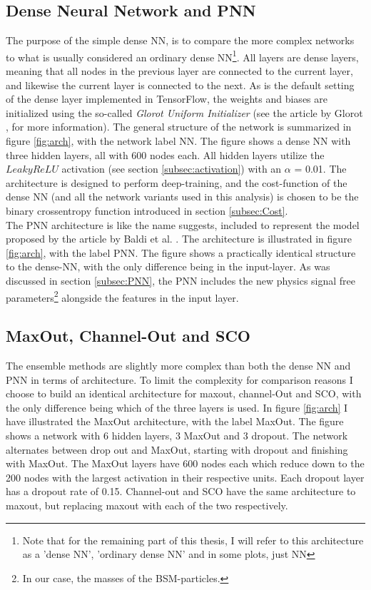 \subsection*{Dense Neural Network and PNN}\label{subsec:PNNArch}
The purpose of the simple dense \ac{NN}, is to compare the more complex networks to what is usually considered an ordinary dense \ac{NN}\footnote{Note 
that for the remaining part of this thesis, I will refer to this architecture as a 'dense \ac{NN}', 'ordinary dense \ac{NN}' and in some plots, just 
\ac{NN}}.
All layers are dense layers, meaning that all nodes in the previous layer are connected to the current layer, and likewise
the current layer is connected to the next. As is the default setting of the dense layer implemented in TensorFlow, the weights and biases are initialized 
using the so-called \emph{Glorot Uniform Initializer} (see the article by Glorot \cite{glorot_understanding_2010}, for more information). 
The general structure of the network is summarized in figure \ref{fig:arch}, with the network label \ac{NN}. The figure shows a dense \ac{NN} with 
three hidden layers, all with 600 nodes each. All hidden layers utilize the $LeakyReLU$ activation (see section \ref{subsec:activation})
with an $\alpha$ = 0.01. The architecture is designed to perform deep-training, and the cost-function of the dense \ac{NN} (and all the network variants used 
in this analysis) is chosen to be the binary crossentropy function introduced in section \ref{subsec:Cost}. 
\\
The \ac{PNN} architecture is like the name suggests, included to represent the model proposed by the article by Baldi et al. \cite{PNN}.
The architecture is illustrated in figure \ref{fig:arch}, with the label PNN. The figure shows a practically identical 
structure to the dense-\ac{NN}, with the only difference being in the input-layer. As was discussed in section \ref{subsec:PNN},
the \ac{PNN} includes the new physics signal free parameters\footnote{In our case, the masses of the \ac{BSM}-particles.} alongside the features
in the input layer.
\subsection*{MaxOut, Channel-Out and SCO}
The ensemble methods are slightly more complex than both the dense \ac{NN} and \ac{PNN} in terms of architecture. To limit the complexity for comparison reasons
I choose to build an identical architecture for maxout, channel-Out and \ac{SCO}, with the only difference being which of the three layers is used.  
In figure \ref{fig:arch} I have illustrated the MaxOut architecture, with the label MaxOut. The figure shows a network with 6 hidden layers, 
3 MaxOut and 3 dropout. The network alternates between drop out and MaxOut, starting with dropout and finishing with MaxOut. The MaxOut layers 
have 600 nodes each which reduce down to the 200 nodes with the largest activation in their respective units. Each dropout layer has a dropout 
rate of 0.15. Channel-out and \ac{SCO} have the same architecture to maxout, but replacing maxout with each of the two respectively.  

